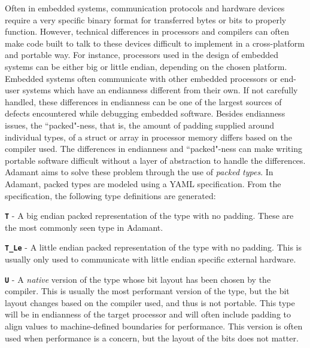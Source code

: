 Often in embedded systems, communication protocols and hardware devices require a very specific binary format for transferred bytes or bits to properly function. However, technical differences in processors and compilers can often make code built to talk to these devices difficult to implement in a cross-platform and portable way. For instance, processors used in the design of embedded systems can be either big or little endian, depending on the chosen platform. Embedded systems often communicate with other embedded processors or end-user systems which have an endianness different from their own. If not carefully handled, these differences in endianness can be one of the largest sources of defects encountered while debugging embedded software. Besides endianness issues, the ``packed"-ness, that is, the amount of padding supplied around individual types, of a struct or array in processor memory differs based on the compiler used. The differences in endianness and ``packed"-ness can make writing portable software difficult without a layer of abstraction to handle the differences. \\

Adamant aims to solve these problem through the use of \textit{packed types}.  In Adamant, packed types are modeled using a YAML specification. From the specification, the following type definitions are generated:

\vspace{5mm} %
\begin{spaceditemize}
  \item \textbf{\texttt{T}} - A big endian packed representation of the type with no padding. These are the most commonly seen type in Adamant.
  \item \textbf{\texttt{T\_Le}} - A little endian packed representation of the type with no padding. This is usually only used to communicate with little endian specific external hardware.
  \item \textbf{\texttt{U}} - A \textit{native} version of the type whose bit layout has been chosen by the compiler. This is usually the most performant version of the type, but the bit layout changes based on the compiler used, and thus is not portable. This type will be in endianness of the target processor and will often include padding to align values to machine-defined boundaries for performance. This version is often used when performance is a concern, but the layout of the bits does not matter.
\end{spaceditemize}
\vspace{5mm} %

